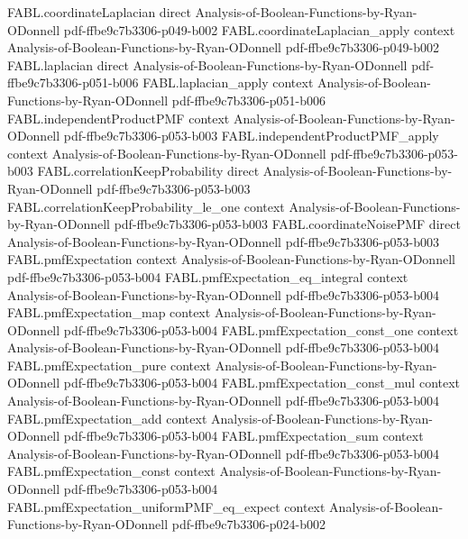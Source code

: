 \begin{theorem}
\proofstep
  {FABL.coordinateLaplacian}
  {direct}
  {Analysis-of-Boolean-Functions-by-Ryan-ODonnell}
  {pdf-ffbe9c7b3306-p049-b002}
\proofstep
  {FABL.coordinateLaplacian_apply}
  {context}
  {Analysis-of-Boolean-Functions-by-Ryan-ODonnell}
  {pdf-ffbe9c7b3306-p049-b002}
\proofstep
  {FABL.laplacian}
  {direct}
  {Analysis-of-Boolean-Functions-by-Ryan-ODonnell}
  {pdf-ffbe9c7b3306-p051-b006}
\proofstep
  {FABL.laplacian_apply}
  {context}
  {Analysis-of-Boolean-Functions-by-Ryan-ODonnell}
  {pdf-ffbe9c7b3306-p051-b006}
\proofstep
  {FABL.independentProductPMF}
  {context}
  {Analysis-of-Boolean-Functions-by-Ryan-ODonnell}
  {pdf-ffbe9c7b3306-p053-b003}
\proofstep
  {FABL.independentProductPMF_apply}
  {context}
  {Analysis-of-Boolean-Functions-by-Ryan-ODonnell}
  {pdf-ffbe9c7b3306-p053-b003}
\proofstep
  {FABL.correlationKeepProbability}
  {direct}
  {Analysis-of-Boolean-Functions-by-Ryan-ODonnell}
  {pdf-ffbe9c7b3306-p053-b003}
\proofstep
  {FABL.correlationKeepProbability_le_one}
  {context}
  {Analysis-of-Boolean-Functions-by-Ryan-ODonnell}
  {pdf-ffbe9c7b3306-p053-b003}
\proofstep
  {FABL.coordinateNoisePMF}
  {direct}
  {Analysis-of-Boolean-Functions-by-Ryan-ODonnell}
  {pdf-ffbe9c7b3306-p053-b003}
\proofstep
  {FABL.pmfExpectation}
  {context}
  {Analysis-of-Boolean-Functions-by-Ryan-ODonnell}
  {pdf-ffbe9c7b3306-p053-b004}
\proofstep
  {FABL.pmfExpectation_eq_integral}
  {context}
  {Analysis-of-Boolean-Functions-by-Ryan-ODonnell}
  {pdf-ffbe9c7b3306-p053-b004}
\proofstep
  {FABL.pmfExpectation_map}
  {context}
  {Analysis-of-Boolean-Functions-by-Ryan-ODonnell}
  {pdf-ffbe9c7b3306-p053-b004}
\proofstep
  {FABL.pmfExpectation_const_one}
  {context}
  {Analysis-of-Boolean-Functions-by-Ryan-ODonnell}
  {pdf-ffbe9c7b3306-p053-b004}
\proofstep
  {FABL.pmfExpectation_pure}
  {context}
  {Analysis-of-Boolean-Functions-by-Ryan-ODonnell}
  {pdf-ffbe9c7b3306-p053-b004}
\proofstep
  {FABL.pmfExpectation_const_mul}
  {context}
  {Analysis-of-Boolean-Functions-by-Ryan-ODonnell}
  {pdf-ffbe9c7b3306-p053-b004}
\proofstep
  {FABL.pmfExpectation_add}
  {context}
  {Analysis-of-Boolean-Functions-by-Ryan-ODonnell}
  {pdf-ffbe9c7b3306-p053-b004}
\proofstep
  {FABL.pmfExpectation_sum}
  {context}
  {Analysis-of-Boolean-Functions-by-Ryan-ODonnell}
  {pdf-ffbe9c7b3306-p053-b004}
\proofstep
  {FABL.pmfExpectation_const}
  {context}
  {Analysis-of-Boolean-Functions-by-Ryan-ODonnell}
  {pdf-ffbe9c7b3306-p053-b004}
\proofstep
  {FABL.pmfExpectation_uniformPMF_eq_expect}
  {context}
  {Analysis-of-Boolean-Functions-by-Ryan-ODonnell}
  {pdf-ffbe9c7b3306-p024-b002}
\proofstep

\end{theorem}

